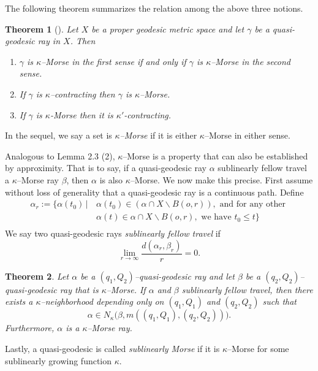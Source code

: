 \documentclass{amsart}
\newtheorem{thm}{Theorem}[section]
\theoremstyle{definition}
\theoremstyle{remark}
\newcommand{\U}{ X}
\begin{document}
The following theorem summarizes the relation among the above three notions.
\begin{thm}[\cite{QRT2}]
Let  $\U$ be a proper geodesic metric space and let $\gamma$ be a quasi-geodesic ray in $\U$. 
Then 
\begin{enumerate}
\item $\gamma$ is $\kappa$--Morse in the first sense  if and only if $\gamma$ is $\kappa$--Morse in the second sense. 
\item If $\gamma$ is $\kappa$--contracting then $\gamma$ is 
$\kappa$--Morse.
\item If $\gamma$ is $\kappa$-Morse then it is $\kappa'$-contracting.
\end{enumerate}
\end{thm}
In the sequel, we say a set is \textit{$\kappa$--Morse} if it is either $\kappa$--Morse  in  either sense.

Analogous to Lemma 2.3 (2), $\kappa$--Morse  is a property that can also be established by approximity. That is to say,  if a quasi-geodesic ray  $\alpha$ sublinearly fellow travel a $\kappa$--Morse ray $\beta$, then $\alpha$ is also $\kappa$--Morse. We now make this precise. First assume without loss of generality that a quasi-geodesic ray is a continuous path. Define 
\begin{align*}
\alpha_r :=
  \{ \alpha(t_0) \,|\, &\alpha(t_0) \in (\alpha \cap X \backslash B(o, r) ),\text{ and for any other }\\
&\text{} \alpha(t)\in \alpha \cap X \backslash B(o, r), \text { we have } t_0 \leq t \}\\
\end{align*}
We say two quasi-geodesic rays \emph{sublinearly fellow travel} if 
\[ \lim_{r \to \infty} \frac{d(\alpha_r, \beta_r)}{r} = 0.\]
\begin{thm}\cite{QRT2}
Let $\alpha$ be a $(q_1, Q_2)$--quasi-geodesic ray and let $\beta$ be a $(q_2, Q_2)$--quasi-geodesic ray that is $\kappa$--Morse. If $\alpha$ and $\beta$ sublinearly fellow travel, then there exists a $\kappa$--neighborhood depending only on $(q_1, Q_1)$ and $(q_2, Q_2)$ such that 
\[
\alpha \in N_\kappa \big (\beta, m((q_1, Q_1), (q_2, Q_2))\big).\]
Furthermore, $\alpha$ is a $\kappa$--Morse ray.
\end{thm}


Lastly, a quasi-geodesic is called \emph{sublinearly Morse} if it is $\kappa$--Morse for some sublinearly growing function $\kappa$.
\end{document}
